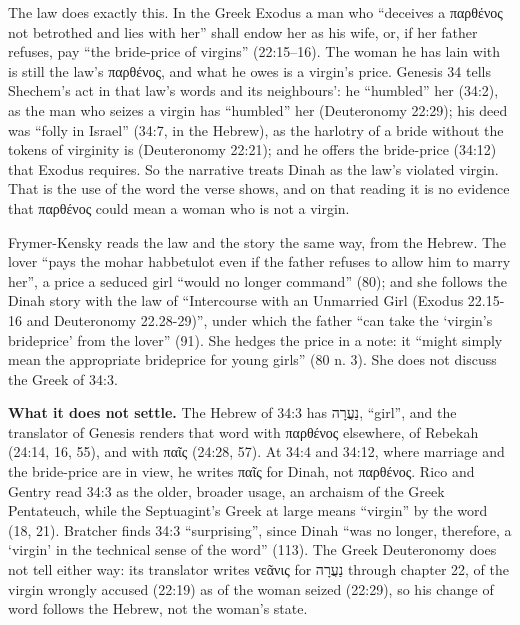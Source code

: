 \documentclass[11pt]{article}
\begin{document}
The law does exactly this. In the Greek Exodus a man who “deceives a παρθένος not betrothed and lies with her” shall endow her as his wife, or, if her father refuses, pay “the bride-price of virgins” (22:15–16). The woman he has lain with is still the law’s παρθένος, and what he owes is a virgin’s price. Genesis 34 tells Shechem’s act in that law’s words and its neighbours’: he “humbled” her (34:2), as the man who seizes a virgin has “humbled” her (Deuteronomy 22:29); his deed was “folly in Israel” (34:7, in the Hebrew), as the harlotry of a bride without the tokens of virginity is (Deuteronomy 22:21); and he offers the bride-price (34:12) that Exodus requires. So the narrative treats Dinah as the law’s violated virgin. That is the use of the word the verse shows, and on that reading it is no evidence that παρθένος could mean a woman who is not a virgin.

Frymer-Kensky reads the law and the story the same way, from the Hebrew. The lover “pays the mohar habbetulot even if the father refuses to allow him to marry her”, a price a seduced girl “would no longer command” (80); and she follows the Dinah story with the law of “Intercourse with an Unmarried Girl (Exodus 22.15-16 and Deuteronomy 22.28-29)”, under which the father “can take the ‘virgin’s brideprice’ from the lover” (91). She hedges the price in a note: it “might simply mean the appropriate brideprice for young girls” (80 n. 3). She does not discuss the Greek of 34:3.

\textbf{What it does not settle.} The Hebrew of 34:3 has נַעֲרָה, “girl”, and the translator of Genesis renders that word with παρθένος elsewhere, of Rebekah (24:14, 16, 55), and with παῖς (24:28, 57). At 34:4 and 34:12, where marriage and the bride-price are in view, he writes παῖς for Dinah, not παρθένος. Rico and Gentry read 34:3 as the older, broader usage, an archaism of the Greek Pentateuch, while the Septuagint’s Greek at large means “virgin” by the word (18, 21). Bratcher finds 34:3 “surprising”, since Dinah “was no longer, therefore, a ‘virgin’ in the technical sense of the word” (113). The Greek Deuteronomy does not tell either way: its translator writes νεᾶνις for נַעֲרָה through chapter 22, of the virgin wrongly accused (22:19) as of the woman seized (22:29), so his change of word follows the Hebrew, not the woman’s state.
\end{document}
